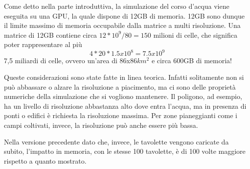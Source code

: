 		Come detto nella parte introduttiva, la simulazione del corso d'acqua viene eseguita su una GPU, la quale dispone di 12GB di memoria. 12GB sono dunque il limite massimo di memoria occupabile dalla matrice a multi risoluzione. Una matrice di 12GB contiene circa $12*10^9/80 = 150$ milioni di celle, che significa poter rappresentare al pi\`{u}
		\[
			4*20*1.5x10^{8} = 7.5x10^{9} 
		\]
		7,5 miliardi di celle, ovvero un'area di 86x86$km^2$ e circa 600GB di memoria!

		Queste considerazioni sono state fatte in linea teorica. Infatti solitamente non si pu\`{o} abbassare o alzare la risoluzione a piacimento, ma ci sono delle propriet\`{a} numeriche della simulazione che si vogliono mantenere. Il poligono, ad esempio, ha un livello di risoluzione abbastanza alto dove entra l'acqua, ma in presenza di ponti o edifici \`{e} richiesta la risoluzione massima. Per zone pianeggianti come i campi coltivati, invece, la risoluzione pu\`{o} anche essere pi\`{u} bassa. 

		Nella versione precedente dato che, invece, le tavolette vengono caricate da subito, l'impatto in memoria, con le stesse 100 tavolette, \`{e} di 100 volte maggiore rispetto a quanto mostrato.

